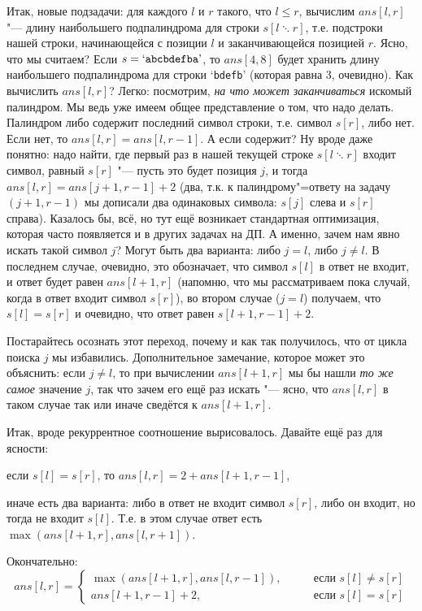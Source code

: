 Итак, новые подзадачи: для каждого $l$ и $r$ такого, что $l\leq r$, вычислим $ans[l,r]$ "--- длину 
наибольшего подпалиндрома для строки $s[l\ddots r]$, т.е. подстроки нашей строки, начинающейся с 
позиции $l$ и заканчивающейся позицией $r$. Ясно, что мы считаем? Если 
$s=\mbox{`\texttt{abcbdefba}'}$, то $ans[4,8]$ будет хранить длину наибольшего подпалиндрома для строки 
`\texttt{bdefb}' (которая равна 3, очевидно). Как вычислить $ans[l,r]$? Легко: посмотрим, 
\textit{на что может заканчиваться} искомый палиндром. Мы ведь уже имеем общее представление о том, 
что надо делать. Палиндром либо содержит последний символ строки, т.е. символ $s[r]$, либо нет. 
Если нет, то $ans[l,r]=ans[l,r-1]$. А если содержит? Ну вроде даже понятно: надо найти, где первый 
раз в нашей текущей строке $s[l\ddots r]$ входит символ, равный $s[r]$ "--- пусть это будет позиция 
$j$, и тогда $ans[l,r]=ans[j+1,r-1]+2$ (два, т.к. к палиндрому"=ответу на задачу $(j+1,r-1)$ мы 
дописали два одинаковых символа: $s[j]$ слева и $s[r]$ справа). Казалось бы, всё, но тут ещё возникает 
стандартная оптимизация, которая часто появляется и в других задачах на ДП. А именно, зачем нам 
явно искать такой символ $j$? Могут быть два варианта: либо $j=l$, либо $j\neq l$. В последнем 
случае, очевидно, это обозначает, что символ $s[l]$ в ответ не входит, и ответ будет равен 
$ans[l+1,r]$ (напомню, что мы рассматриваем пока случай, когда в ответ входит символ $s[r]$), во 
втором случае ($j=l$) получаем, что $s[l]=s[r]$ и очевидно, что ответ равен $s[l+1,r-1]+2$. 

Постарайтесь осознать этот переход, почему и как так получилось, что от цикла поиска $j$ мы 
избавились. Дополнительное замечание, которое может это объяснить: если $j\neq l$, то при 
вычислении $ans[l+1,r]$ мы бы нашли \textit{то же самое} значение $j$, так что зачем его ещё раз 
искать "--- ясно, что $ans[l,r]$ в таком случае так или иначе сведётся к $ans[l+1,r]$.

Итак, вроде рекуррентное соотношение вырисовалось. Давайте ещё раз для ясности:

если $s[l]=s[r]$, то $ans[l,r]=2+ans[l+1,r-1]$, 

иначе есть два варианта: либо в ответ не входит символ $s[r]$, либо он входит, но тогда не входит 
$s[l]$. Т.е. в этом случае ответ есть $\max(ans[l+1,r],ans[l,r+1])$.

Окончательно:
$$
ans[l,r]=\left\{\begin{array}{ll}
\max(ans[l+1,r],ans[l,r-1]),\qquad&\mbox{если }s[l]\neq s[r]\\
ans[l+1,r-1]+2,\qquad&\mbox{если }s[l]=s[r]
\end{array}\right.
$$

